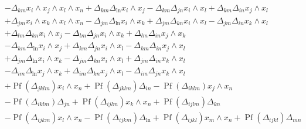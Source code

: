 \documentclass[aps, preprint]{revtex4}
\begin{document}
\begin{align}
 &  - \Delta _{k m}x_{i} \wedge x_{j} \wedge x_{l} \wedge x_{n} + \Delta _{k m} \Delta _{\ln }x_{i} \wedge x_{j} - \Delta _{k m} \Delta _{j n}x_{i} \wedge x_{l} + \Delta _{k m} \Delta _{i n}x_{j} \wedge x_{l} \nonumber  \\
 &  + \Delta _{j m}x_{i} \wedge x_{k} \wedge x_{l} \wedge x_{n} - \Delta _{j m} \Delta _{\ln }x_{i} \wedge x_{k} + \Delta _{j m} \Delta _{k n}x_{i} \wedge x_{l} - \Delta _{j m} \Delta _{i n}x_{k} \wedge x_{l} \nonumber  \\
 &  + \Delta _{l m} \Delta _{k n}x_{i} \wedge x_{j} - \Delta _{l m} \Delta _{j n}x_{i} \wedge x_{k} + \Delta _{l m} \Delta _{i n}x_{j} \wedge x_{k} \nonumber  \\
 &  - \Delta _{k m} \Delta _{\ln }x_{i} \wedge x_{j} + \Delta _{k m} \Delta _{j n}x_{i} \wedge x_{l} - \Delta _{k m} \Delta _{i n}x_{j} \wedge x_{l} \nonumber  \\
 &  + \Delta _{j m} \Delta _{\ln }x_{i} \wedge x_{k} - \Delta _{j m} \Delta _{k n}x_{i} \wedge x_{l} + \Delta _{j m} \Delta _{i n}x_{k} \wedge x_{l} \nonumber  \\
 &  - \Delta _{i m} \Delta _{\ln }x_{j} \wedge x_{k} + \Delta _{i m} \Delta _{k n}x_{j} \wedge x_{l} - \Delta _{i m} \Delta _{j n}x_{k} \wedge x_{l} \nonumber  \\
 &  +\ensuremath{\operatorname*{Pf}} \left ( \Delta _{j k l m}\right ) x_{i} \wedge x_{n} +\ensuremath{\operatorname*{Pf}} \left ( \Delta _{j k l m}\right )  \Delta _{i n} -\ensuremath{\operatorname*{Pf}} \left ( \Delta _{i k l m}\right ) x_{j} \wedge x_{n} \nonumber  \\
 &  -\ensuremath{\operatorname*{Pf}} \left ( \Delta _{i k l m}\right )  \Delta _{j n} +\ensuremath{\operatorname*{Pf}} \left ( \Delta _{i j l m}\right ) x_{k} \wedge x_{n} +\ensuremath{\operatorname*{Pf}} \left ( \Delta _{i j l m}\right ) \Delta _{k n} \nonumber  \\
 &  -\ensuremath{\operatorname*{Pf}} \left ( \Delta _{i j k m}\right ) x_{l} \wedge x_{n} -\ensuremath{\operatorname*{Pf}} \left ( \Delta _{i j k m}\right )  \Delta _{\ln } +\ensuremath{\operatorname*{Pf}} \left ( \Delta _{i j k l}\right ) x_{m} \wedge x_{n} +\ensuremath{\operatorname*{Pf}} \left ( \Delta _{i j k l}\right ) \Delta _{m n}\end{align}
\end{document}
